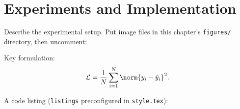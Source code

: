 \section{Experiments and Implementation}
\label{sec:work-experiments}


Describe the experimental setup. Put image files in this chapter's
\texttt{figures/} directory, then uncomment:


Key formulation:
\begin{equation}
  \label{eq:loss}
  \mathcal{L} = \frac{1}{N}\sum_{i=1}^{N}\norm{y_i - \hat{y}_i}^2 .
\end{equation}

A code listing (\texttt{listings} preconfigured in \texttt{style.tex}):

